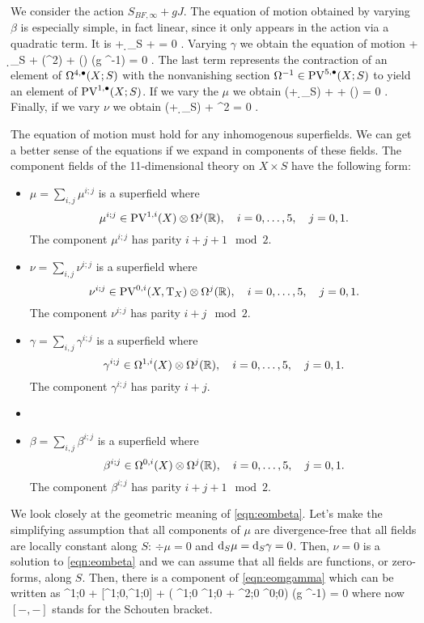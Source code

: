We consider the action $S_{BF, \infty} + gJ$.
The equation of motion obtained by varying $\beta$ is especially simple, in fact linear, since it only appears in the action via a quadratic term. 
It is
\beqn\label{eqn:eombeta}
\dbar \nu + \d_S \nu + \div \mu = 0 .
\eeqn
Varying $\gamma$ we obtain the equation of motion
\beqn\label{eqn:eomgamma}
\dbar \mu + \d_S \mu +   \div (\mu^2) +  (\del \gamma \wedge \del \gamma) \vee (g \Omega^{-1}) = 0 .
\eeqn
The last term represents the contraction of an element of $\Omega^{4,\bullet}(X;S)$ with the nonvanishing section $\Omega^{-1} \in {\rm PV}^{5,\bullet}(X;S)$ to yield an element of ${\rm PV}^{1,\bullet}(X;S)$. 
If we vary the $\mu$ we obtain 
\beqn\label{eqn:eommu}
(\dbar + \d_S) \gamma + \del \beta +  (\mu \vee \del \gamma) = 0 .
\eeqn
Finally, if we vary $\nu$ we obtain
\beqn\label{eqn:eomnu}
(\dbar + \d_S) \beta +   \mu^2 \vee \del \gamma = 0 .
\eeqn

The equation of motion must hold for any inhomogenous superfields.
We can get a better sense of the equations if we expand in components of these fields. 
The component fields of the 11-dimensional theory on $X \times S$ have the following form: 
\begin{itemize}
\item $\mu = \sum_{i,j} \mu^{i;j}$ is a superfield where
\[
\mu^{i;j} \in {\rm PV}^{1,i}(X) \otimes \Omega^j(\mathbb R) ,\quad i=0,\ldots, 5, \quad j=0,1.
\]
The component $\mu^{i;j}$ has parity $i+j+1 \mod 2$. 
\item $\nu = \sum_{i,j} \nu^{i;j}$ is a superfield where
\[
\nu^{i;j} \in {\rm PV}^{0,i}(X, {\rm T}_X) \otimes \Omega^j(\mathbb R) ,\quad i=0,\ldots, 5, \quad j=0,1.
\]
The component $\nu^{i;j}$ has parity $i+j \mod 2$. 
\item 
$\gamma = \sum_{i,j} \gamma^{i;j}$ is a superfield where
\[
\gamma^{i;j} \in \Omega^{1,i}(X) \otimes \Omega^j(\mathbb R) ,\quad i=0,\ldots, 5, \quad j=0,1.
\]
The component $\gamma^{i;j}$ has parity $i+j$. 
\item 
\item $\beta = \sum_{i,j} \beta^{i;j}$ is a superfield where
\[
\beta^{i;j} \in \Omega^{0,i}(X) \otimes \Omega^j(\mathbb R) ,\quad i=0,\ldots, 5, \quad j=0,1.
\]
The component $\beta^{i;j}$ has parity $i+j+1 \mod 2$. 
\end{itemize}

We look closely at the geometric meaning of \eqref{eqn:eombeta}. 
Let's make the simplifying assumption that all components of $\mu$ are divergence-free that all fields are locally constant along $S$: $\div \mu = 0$ and ${\rm d}_S \mu = {\rm d}_S \gamma = 0$.
Then, $\nu = 0$ is a solution to \eqref{eqn:eombeta} and we can assume that all fields are functions, or zero-forms, along $S$. 
Then, there is a component of \eqref{eqn:eomgamma} which can be written as 
\beqn\label{eqn:eomgamma1}
\dbar \mu^{1;0} +  [\mu^{1;0},\mu^{1;0}] + \left( \del \gamma^{1;0} \wedge \del \gamma^{1;0} + \del \gamma^{2;0} \wedge \del \gamma^{0;0}\right) \vee (g \Omega^{-1}) = 0 
\eeqn
where now $[-,-]$ stands for the Schouten bracket.

